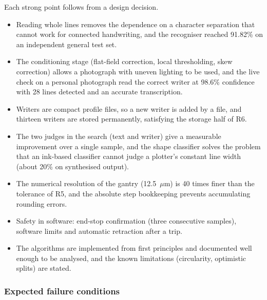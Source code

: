         Each strong point follows from a design decision.
        \begin{itemize}
          \item Reading whole lines removes the dependence on a character separation that cannot work for connected handwriting, and the recogniser reached 91.82\% on an independent general test set.
          \item The conditioning stage (flat-field correction, local thresholding, skew correction) allows a photograph with uneven lighting to be used, and the live check on a personal photograph read the correct writer at 98.6\% confidence with 28 lines detected and an accurate transcription.
          \item Writers are compact profile files, so a new writer is added by a file, and thirteen writers are stored permanently, satisfying the storage half of R6.
          \item The two judges in the search (text and writer) give a measurable improvement over a single sample, and the shape classifier solves the problem that an ink-based classifier cannot judge a plotter's constant line width (about 20\% on synthesised output).
          \item The numerical resolution of the gantry (12.5~$\mu$m) is 40 times finer than the tolerance of R5, and the absolute step bookkeeping prevents accumulating rounding errors.
          \item Safety in software: end-stop confirmation (three consecutive samples), software limits and automatic retraction after a trip.
          \item The algorithms are implemented from first principles and documented well enough to be analysed, and the known limitations (circularity, optimistic splits) are stated.
        \end{itemize}

    \subsubsection{Expected failure conditions}
    \label{sec:dis-failure}

